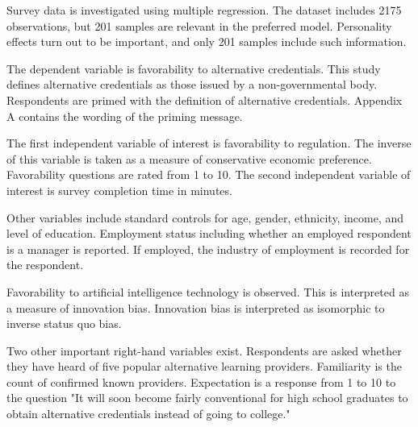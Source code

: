 \documentclass[review]{elsarticle}
\begin{document}
Survey data is investigated using multiple regression.
The dataset includes 2175 observations, but 201 samples are relevant in the preferred model.
Personality effects turn out to be important, and only 201 samples include such information.

The dependent variable is favorability to alternative credentials.
This study defines alternative credentials as those issued by a non-governmental body.
Respondents are primed with the definition of alternative credentials.
Appendix A contains the wording of the priming message.

The first independent variable of interest is favorability to regulation.
The inverse of this variable is taken as a measure of conservative economic preference.
Favorability questions are rated from 1 to 10.
The second independent variable of interest is survey completion time in minutes.

Other variables include standard controls for age,
gender, ethnicity, income, and level of education.
Employment status including whether an employed respondent is a manager is reported.
If employed, the industry of employment is recorded for the respondent.

Favorability to artificial intelligence technology is observed.
This is interpreted as a measure of innovation bias.
Innovation bias is interpreted as isomorphic to inverse status quo bias.

Two other important right-hand variables exist.
Respondents are asked whether they have heard of five popular alternative learning providers.
Familiarity is the count of confirmed known providers.
Expectation is a response from 1 to 10 to the question
"It will soon become fairly conventional for high school graduates to obtain alternative credentials instead of going to college."

%
\end{document}
